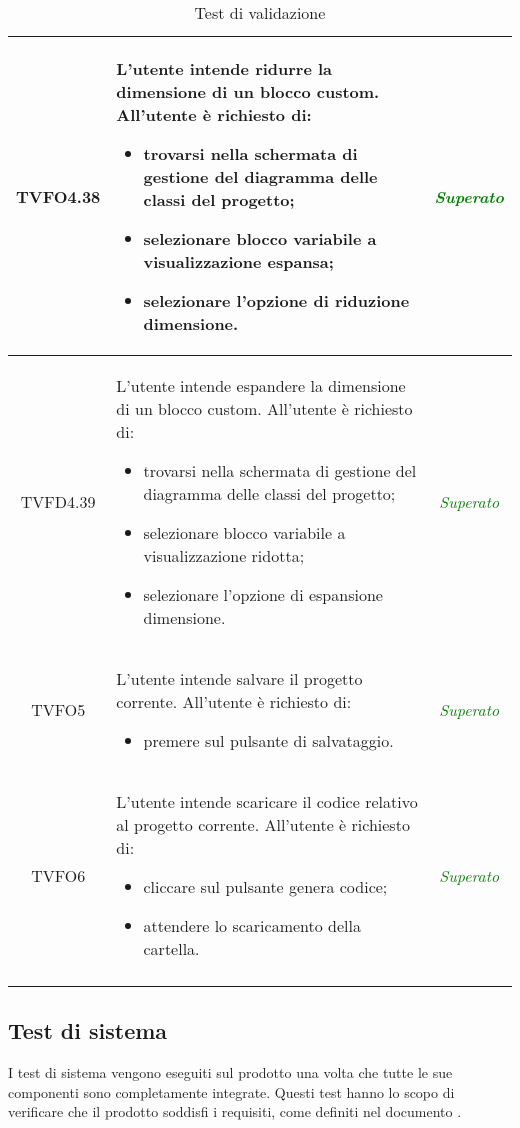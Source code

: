 \begin{longtable}{|c|>{}m{8cm}|c|}
\hypertarget{TVFO4.38}{TVFO4.38} & L'utente intende ridurre la dimensione di un blocco custom.
All'utente è richiesto di:
\begin{itemize}
	\item trovarsi nella schermata di gestione del diagramma delle classi del progetto;
	\item selezionare blocco variabile a visualizzazione espansa;
	\item selezionare l'opzione di riduzione dimensione.
\end{itemize} & \textcolor{Green}{\textit{Superato}}\\ \hline

\hypertarget{TVFD4.39}{TVFD4.39} & L'utente intende espandere la dimensione di un blocco custom.
All'utente è richiesto di:
\begin{itemize}
	\item trovarsi nella schermata di gestione del diagramma delle classi del progetto;
	\item selezionare blocco variabile a visualizzazione ridotta;
	\item selezionare l'opzione di espansione dimensione.
\end{itemize} & \textcolor{Green}{\textit{Superato}}\\ \hline

\hypertarget{TVFO5}{TVFO5} & L'utente intende salvare il progetto corrente.
All'utente è richiesto di:
\begin{itemize}
	\item premere sul pulsante di salvataggio.
\end{itemize} & \textcolor{Green}{\textit{Superato}}\\ \hline

\hypertarget{TVFO6}{TVFO6} & L'utente intende scaricare il codice relativo al progetto corrente.
All'utente è richiesto di:
\begin{itemize}
	\item cliccare sul pulsante genera codice;
	\item attendere lo scaricamento della cartella.
\end{itemize} & \textcolor{Green}{\textit{Superato}}\\ \hline
\caption[Test di validazione]{Test di validazione}
\label{tab:valid}
\end{longtable}
\clearpage


\subsection{Test di sistema}
I test di sistema vengono eseguiti sul prodotto una volta che tutte le sue componenti sono completamente integrate. Questi test hanno lo scopo di verificare che il prodotto soddisfi i requisiti, come definiti nel documento \AdR.

